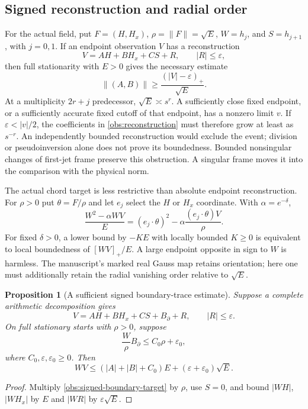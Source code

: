 \documentclass[11pt]{article}
\numberwithin{equation}{section}
\newtheorem{proposition}[theorem]{Proposition}
\theoremstyle{definition}
\theoremstyle{remark}
\begin{document}
\subsection{Signed reconstruction and radial order}

For the actual field, put $F=(H,H_x)$, $\rho=\|F\|=\sqrt E$,
$W=h_j$, and $S=h_{j+1}$, with $j=0,1$.
If an endpoint observation $V$ has a reconstruction
\begin{equation}
 V=AH+BH_x+CS+R,\qquad |R|\le\varepsilon,
 \label{obs:reconstruction}
\end{equation}
then full stationarity with $E>0$ gives the necessary estimate
\begin{equation}
 \|(A,B)\|\ge\frac{(|V|-\varepsilon)_+}{\sqrt E}.
 \label{obs:reconstruction-cost}
\end{equation}
At a multiplicity $2r+j$ predecessor, $\sqrt E\asymp s^r$.
A sufficiently close fixed endpoint, or a sufficiently accurate fixed
cutoff of that endpoint, has a nonzero limit $v$.
If $\varepsilon<|v|/2$, the coefficients in
\eqref{obs:reconstruction} must therefore grow at least as $s^{-r}$.
An independently bounded reconstruction would exclude the event;
division or pseudoinversion alone does not prove its boundedness.
Bounded nonsingular changes of first-jet frame preserve this
obstruction.  A singular frame moves it into the comparison with
the physical norm.

The actual chord target is less restrictive than absolute endpoint
reconstruction.  For $\rho>0$ put $\theta=F/\rho$ and let $e_j$
select the $H$ or $H_x$ coordinate.  With $\alpha=e^{-\delta}$,
\begin{equation}
 \frac{W^2-\alpha WV}{E}
 =(e_j\cdot\theta)^2
   -\alpha\frac{(e_j\cdot\theta)V}{\rho}.
 \label{obs:radial-signed-observation}
\end{equation}
For fixed $\delta>0$, a lower bound by $-KE$ with locally bounded $K\ge0$ is
equivalent to local boundedness of $[WV]_+/E$.
A large endpoint opposite in sign to $W$ is harmless.
The manuscript's marked real Gauss map retains orientation; here
one must additionally retain the radial vanishing order relative
to $\sqrt E$.

\begin{proposition}[A sufficient signed boundary-trace estimate]
\label{obs:signed-trace}
Suppose a complete arithmetic decomposition gives
\[
 V=AH+BH_x+CS+B_{\partial}+R,\qquad |R|\le\varepsilon.
\]
On full stationary starts with $\rho>0$, suppose
\begin{equation}
 \frac{W}{\rho}B_{\partial}
 \le C_0\rho+\varepsilon_0,
 \label{obs:signed-boundary-target}
\end{equation}
where $C_0,\varepsilon,\varepsilon_0\ge0$.
Then
\begin{equation}
 WV\le(|A|+|B|+C_0)E
       +(\varepsilon+\varepsilon_0)\sqrt E.
 \label{obs:signed-boundary-transfer}
\end{equation}
\end{proposition}
\begin{proof}
Multiply \eqref{obs:signed-boundary-target} by $\rho$, use $S=0$,
and bound $|WH|$, $|WH_x|$ by $E$ and $|WR|$ by
$\varepsilon\sqrt E$.
\end{proof}
\end{document}
